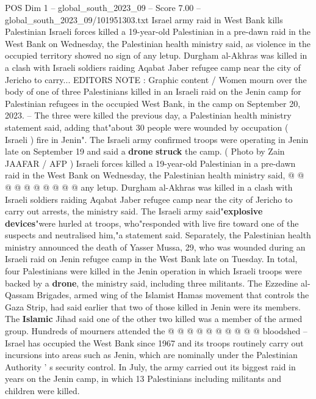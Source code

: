 \begin{textsample}{POS Dim 1 – global\_south\_2023\_09 – Score 7.00 – global\_south\_2023\_09/101951303.txt}  \label{ex:f1_pos_433}
Israel army raid in West Bank kills Palestinian Israeli forces killed a 19-year-old Palestinian in a pre-dawn raid in the West Bank on Wednesday, the Palestinian health ministry said, as violence in the occupied territory showed no sign of any letup.
Durgham al-Akhras was killed in a clash with Israeli soldiers raiding Aqabat Jaber refugee camp near the city of Jericho to carry...
EDITORS NOTE : Graphic content / Women mourn over the body of one of three Palestinians killed in an Israeli raid on the Jenin camp for Palestinian refugees in the occupied West Bank, in the camp on September 20, 2023. -- The three were killed the previous day, a Palestinian health ministry statement said, adding that"about 30 people were wounded by occupation ( Israeli ) fire in Jenin".
The Israeli army confirmed troops were operating in Jenin late on September 19 and said a \textbf{drone} \textbf{struck} the camp. ( Photo by Zain JAAFAR / AFP ) Israeli forces killed a 19-year-old Palestinian in a pre-dawn raid in the West Bank on Wednesday, the Palestinian health ministry said, @ @ @ @ @ @ @ @ @ @ any letup.
Durgham al-Akhras was killed in a clash with Israeli soldiers raiding Aqabat Jaber refugee camp near the city of Jericho to carry out arrests, the ministry said.
The Israeli army said"\textbf{explosive} \textbf{devices}"were hurled at troops, who"responded with live fire toward one of the suspects and neutralised him,"a statement said.
Separately, the Palestinian health ministry announced the death of Yasser Mussa, 29, who was wounded during an Israeli raid on Jenin refugee camp in the West Bank late on Tuesday.
In total, four Palestinians were killed in the Jenin operation in which Israeli troops were backed by a \textbf{drone}, the ministry said, including three militants.
The Ezzedine al-Qassam Brigades, armed wing of the Islamist Hamas movement that controls the Gaza Strip, had said earlier that two of those killed in Jenin were its members.
The \textbf{Islamic} Jihad said one of the other two killed was a member of the armed group.
Hundreds of mourners attended the @ @ @ @ @ @ @ @ @ @ bloodshed -- Israel has occupied the West Bank since 1967 and its troops routinely carry out incursions into areas such as Jenin, which are nominally under the Palestinian Authority ' s security control.
In July, the army carried out its biggest raid in years on the Jenin camp, in which 13 Palestinians including militants and children were killed.

\end{textsample}
